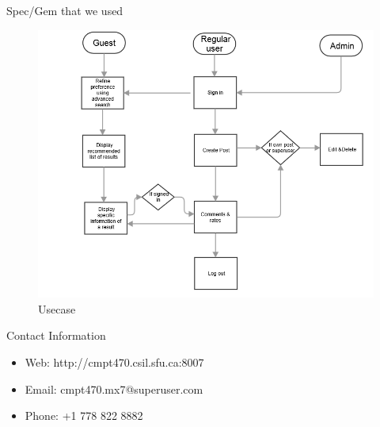 \documentclass[final]{beamer}
\newlength{\onecolwid}
\begin{document}
\begin{frame}[t]
\begin{columns}[t]
\begin{column}{\onecolwid}
\begin{alertblock}{Spec/Gem that we used}
\end{alertblock}
\begin{figure}
\includegraphics[height=0.6\linewidth]{diagram.png}
\caption{Usecase}
\end{figure}



\begin{alertblock}{Contact Information}
\begin{itemize}
\item Web: http://cmpt470.csil.sfu.ca:8007
\item Email: cmpt470.mx7@superuser.com
\item Phone: +1 778 822 8882
\end{itemize}
\end{alertblock}

\end{column} %

\end{columns} %

\end{frame} %
\end{document}
